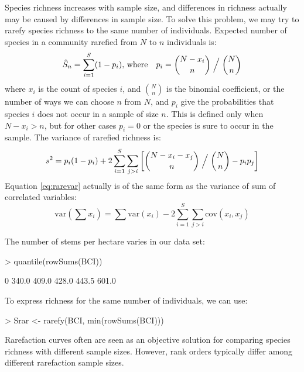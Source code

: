 \documentclass[a4paper,10pt]{amsart}
\begin{document}
Species richness increases with sample size, and differences in
richness actually may be caused by differences in sample size.  To
solve this problem, we may try to rarefy species richness to the same
number of individuals.  Expected number of species in a community
rarefied from $N$ to $n$ individuals is:
\begin{equation}
\label{eq:rare}
\hat S_n = \sum_{i=1}^S (1 - p_i),\, \text{where} \quad p_i = {N-x_i
  \choose n} \Bigm /{N \choose n}
\end{equation}
where $x_i$ is the count of species $i$, and ${N \choose n}$ is the
binomial coefficient, or the number of ways we can choose $n$ from
$N$, and $p_i$ give the probabilities that species $i$ does not occur in a
sample of size $n$.  This is defined only when $N-x_i > n$, but for
other cases $p_i = 0$ or the species is sure to occur in the sample.
The variance of rarefied richness is:
\begin{equation}
\label{eq:rarevar}
s^2 = p_i (1-p_i) + 2 \sum_{i=1}^S \sum_{j>i} \left[ {N- x_i - x_j
    \choose n} \Bigm / {N
    \choose n} - p_i p_j\right]
\end{equation}
Equation \ref{eq:rarevar} actually is of the same form as the variance
of sum of correlated variables:
\begin{equation}
\mathrm{var} \left(\sum x_i \right) = \sum \mathrm{var}(x_i) - 2 \sum_{i=1}^S
\sum_{j>i} \mathrm{cov}(x_i, x_j)
\end{equation}

The number of stems per hectare varies in our
data set:
\begin{Schunk}
\begin{Sinput}
> quantile(rowSums(BCI))
\end{Sinput}
\begin{Soutput}
   0%   25%   50%   75%  100% 
340.0 409.0 428.0 443.5 601.0 
\end{Soutput}
\end{Schunk}
To express richness for the same number of individuals, we can use:
\begin{Schunk}
\begin{Sinput}
> Srar <- rarefy(BCI, min(rowSums(BCI)))
\end{Sinput}
\end{Schunk}
Rarefaction curves often are seen as an objective solution for
comparing species richness with different sample sizes.  However, rank
orders typically differ among different rarefaction sample sizes.
\end{document}
